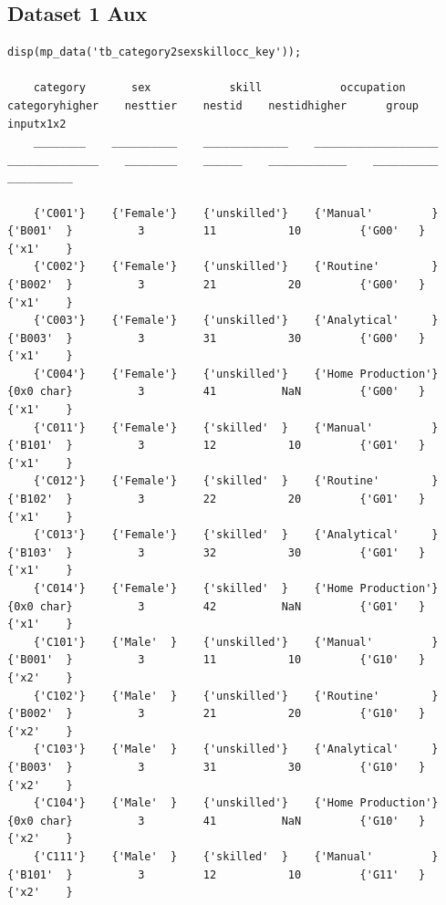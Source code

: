 \documentclass[
]{book}
\begin{document}
\hypertarget{dataset-1-aux}{%
\subsection{Dataset 1 Aux}\label{dataset-1-aux}}

\begin{verbatim}
disp(mp_data('tb_category2sexskillocc_key'));

    category       sex            skill            occupation         categoryhigher    nesttier    nestid    nestidhigher      group       inputx1x2 
    ________    __________    _____________    ___________________    ______________    ________    ______    ____________    __________    __________

    {'C001'}    {'Female'}    {'unskilled'}    {'Manual'         }      {'B001'  }          3         11           10         {'G00'   }    {'x1'    }
    {'C002'}    {'Female'}    {'unskilled'}    {'Routine'        }      {'B002'  }          3         21           20         {'G00'   }    {'x1'    }
    {'C003'}    {'Female'}    {'unskilled'}    {'Analytical'     }      {'B003'  }          3         31           30         {'G00'   }    {'x1'    }
    {'C004'}    {'Female'}    {'unskilled'}    {'Home Production'}      {0x0 char}          3         41          NaN         {'G00'   }    {'x1'    }
    {'C011'}    {'Female'}    {'skilled'  }    {'Manual'         }      {'B101'  }          3         12           10         {'G01'   }    {'x1'    }
    {'C012'}    {'Female'}    {'skilled'  }    {'Routine'        }      {'B102'  }          3         22           20         {'G01'   }    {'x1'    }
    {'C013'}    {'Female'}    {'skilled'  }    {'Analytical'     }      {'B103'  }          3         32           30         {'G01'   }    {'x1'    }
    {'C014'}    {'Female'}    {'skilled'  }    {'Home Production'}      {0x0 char}          3         42          NaN         {'G01'   }    {'x1'    }
    {'C101'}    {'Male'  }    {'unskilled'}    {'Manual'         }      {'B001'  }          3         11           10         {'G10'   }    {'x2'    }
    {'C102'}    {'Male'  }    {'unskilled'}    {'Routine'        }      {'B002'  }          3         21           20         {'G10'   }    {'x2'    }
    {'C103'}    {'Male'  }    {'unskilled'}    {'Analytical'     }      {'B003'  }          3         31           30         {'G10'   }    {'x2'    }
    {'C104'}    {'Male'  }    {'unskilled'}    {'Home Production'}      {0x0 char}          3         41          NaN         {'G10'   }    {'x2'    }
    {'C111'}    {'Male'  }    {'skilled'  }    {'Manual'         }      {'B101'  }          3         12           10         {'G11'   }    {'x2'    }

\end{verbatim}
\end{document}
